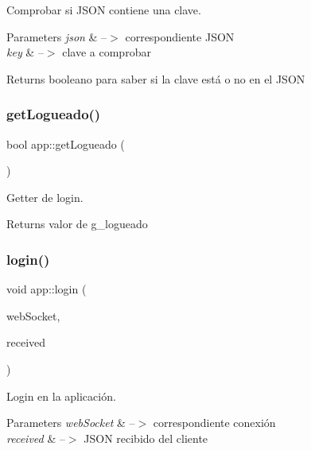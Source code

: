 Comprobar si J\+S\+ON contiene una clave. 


\begin{DoxyParams}{Parameters}
{\em json} & --$>$ correspondiente J\+S\+ON \\
\hline
{\em key} & --$>$ clave a comprobar \\
\hline
\end{DoxyParams}
\begin{DoxyReturn}{Returns}
booleano para saber si la clave está o no en el J\+S\+ON 
\end{DoxyReturn}
\mbox{\label{classapp_a9d5d32bf19b4ae0a9c9d7fab8d87ac0f}} 
\subsubsection{\texorpdfstring{get\+Logueado()}{getLogueado()}}
{\footnotesize\ttfamily bool app\+::get\+Logueado (\begin{DoxyParamCaption}{ }\end{DoxyParamCaption})}



Getter de login. 

\begin{DoxyReturn}{Returns}
valor de g\+\_\+logueado 
\end{DoxyReturn}
\mbox{\label{classapp_a0bb96ab42618921392ac30e13444391c}} 
\subsubsection{\texorpdfstring{login()}{login()}}
{\footnotesize\ttfamily void app\+::login (\begin{DoxyParamCaption}\item[{ix\+::\+Web\+Socket $\ast$}]{web\+Socket,  }\item[{J\+S\+ON}]{received }\end{DoxyParamCaption})}



Login en la aplicación. 


\begin{DoxyParams}{Parameters}
{\em web\+Socket} & --$>$ correspondiente conexión \\
\hline
{\em received} & --$>$ J\+S\+ON recibido del cliente \\
\hline
\end{DoxyParams}
\mbox{\label{classapp_a93176ba428640e16ea767d95319ce0c2}} 
